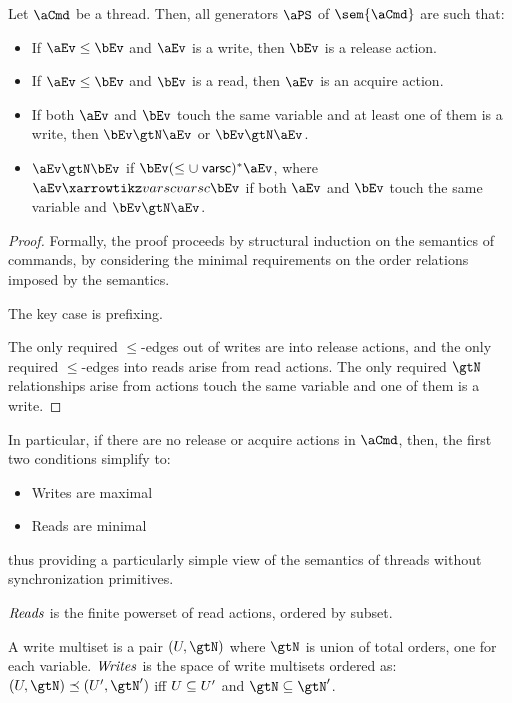 \begin{lemma}
Let $\aCmd$ be a thread.  Then, all generators $\aPS$ of  $\sem{\aCmd}$  are such that:
\begin{itemize}
\item  If $\aEv\le\bEv$ and $\aEv$ is a write, then $\bEv$ is a release action.
\item  If $\aEv\le\bEv$ and $\bEv$ is a read, then $\aEv$ is an acquire action.
\item  If both $\aEv$ and $\bEv$ touch the same variable and at least one of them is a write, then $\bEv \gtN \aEv$ or $\bEv \gtN \aEv$.
\item $\aEv \gtN \bEv$ if $ \bEv (\le \cup \rvarsc)^* \aEv$, where
            $ \aEv \xvarsc  \bEv$ if both $\aEv$ and $\bEv$ touch the same variable and $\bEv \gtN \aEv$.
\end{itemize}
\end{lemma}
\begin{proof}
Formally, the proof proceeds by structural induction on the semantics of commands, by considering the minimal requirements on the order relations imposed by the semantics.


The key case is prefixing.  

The only required $\le$-edges out of writes are into release actions, and the only required $\le$-edges into reads arise from read actions. The only required $\gtN$ relationships arise from actions touch the same variable and one of them is a write.   
\end{proof}

In particular, if there are no release or acquire actions in $\aCmd$, then, the first two conditions simplify to:
\begin{itemize}
\item Writes are maximal
\item Reads are minimal
\end{itemize}
thus providing a particularly simple view of the semantics of threads without synchronization primitives.   

\begin{definition}
$\mathit{Reads}$ is the finite powerset of read actions, ordered by subset.  

A write multiset is a pair $(\aWSet,\gtN)$ where $\gtN$ is union of total orders, one for each variable. $\mathit{Writes}$ is the space of write multisets ordered as:
$(\aWSet,\gtN) \preceq (\aWSet',\gtN')$ iff $U \subseteq U'$ and $\gtN \subseteq \gtN'$.
\end{definition}

